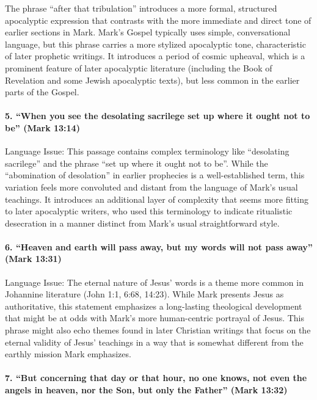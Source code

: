 The phrase ``after that tribulation'' introduces a more formal, structured apocalyptic expression that contrasts with the more immediate and direct tone of earlier sections in Mark.
Mark's Gospel typically uses simple, conversational language, but this phrase carries a more stylized apocalyptic tone, characteristic of later prophetic writings.
It introduces a period of cosmic upheaval, which is a prominent feature of later apocalyptic literature (including the Book of Revelation and some Jewish apocalyptic texts), but less common in the earlier parts of the Gospel.

\paragraph{5.
``When you see the desolating sacrilege set up where it ought not to be'' (Mark 13:14)}\label{par:when-you-see-the-desolating-sacrilege-set-up-where-it-ought-not-to-be-mark-1314}

Language Issue: This passage contains complex terminology like ``desolating sacrilege'' and the phrase ``set up where it ought not to be''.
While the ``abomination of desolation'' in earlier prophecies is a well-established term, this variation feels more convoluted and distant from the language of Mark's usual teachings.
It introduces an additional layer of complexity that seems more fitting to later apocalyptic writers, who used this terminology to indicate ritualistic desecration in a manner distinct from Mark's usual straightforward style.

\paragraph{6.
``Heaven and earth will pass away, but my words will not pass away'' (Mark 13:31)}\label{par:heaven-and-earth-will-pass-away-but-my-words-will-not-pass-away-mark-1331}

Language Issue: The eternal nature of Jesus' words is a theme more common in Johannine literature (John 1:1, 6:68, 14:23).
While Mark presents Jesus as authoritative, this statement emphasizes a long-lasting theological development that might be at odds with Mark's more human-centric portrayal of Jesus.
This phrase might also echo themes found in later Christian writings that focus on the eternal validity of Jesus' teachings in a way that is somewhat different from the earthly mission Mark emphasizes.

\paragraph{7.
``But concerning that day or that hour, no one knows, not even the angels in heaven, nor the Son, but only the Father'' (Mark 13:32)}\label{par:but-concerning-that-day-or-that-hour-no-one-knows-not-even-the-angels-in-heaven-nor-the-son-but-only-the-father-mark-1332}


